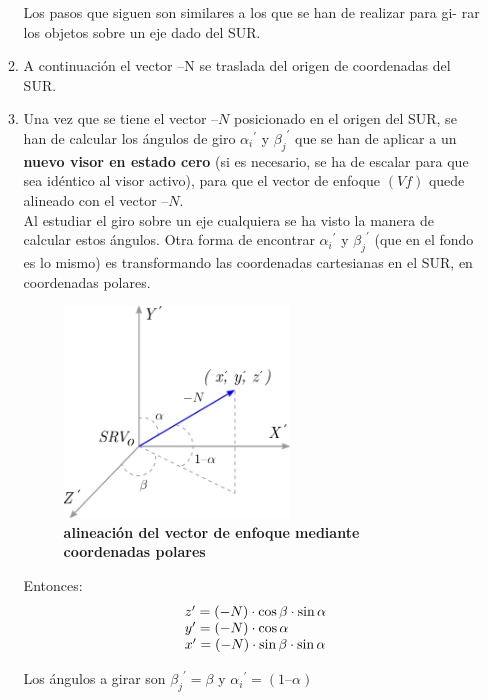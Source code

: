 \begin{itemize}
\begin{enumerate}
        Los pasos que siguen son similares a los que se han de realizar para gi- rar los objetos sobre un eje dado del SUR.
        
        \item A continuación el vector –N se traslada del origen de coordenadas del SUR.
        
        \item Una vez que se tiene el vector $–N$ posicionado en el origen del SUR, se han de calcular los ángulos de giro ${{\alpha}_i}^{\prime}$ y ${{\beta}_j}^{\prime}$ que se han de aplicar a un \textbf{nuevo visor en estado cero} (si es necesario, se ha de escalar para que sea idéntico al visor activo), para que el vector de enfoque $(Vf)$ quede alineado con el vector $–N$.\\
        Al estudiar el giro sobre un eje cualquiera se ha visto la manera de calcular estos ángulos. Otra forma de encontrar ${{\alpha}_i}^{\prime}$ y ${{\beta}_j}^{\prime}$ (que en el fondo es lo mismo) es transformando las coordenadas cartesianas en el SUR, en coordenadas polares. 
        
        \begin{figure}[h]
        \includegraphics[width=6cm]{Img/GEO/geo-visor-11.png}
        \centering
        \caption{\footnotesize{\textbf{alineación del vector de enfoque mediante coordenadas polares}}}
        \label{geo-visor11}
        \end{figure}
        
        Entonces:
        $$
        \begin{array}{l@{}l}
        {z^{\prime}} = (-N) \cdot \cos{\beta} \cdot \sin{\alpha}\\
        {y^{\prime}} = (-N) \cdot \cos{\alpha}\\
        {x^{\prime}} = (-N) \cdot \sin{\beta} \cdot \sin{\alpha}
        \end{array}
        $$
        
        Los ángulos a girar son ${{\beta}_j}^{\prime} = \beta$  y ${{\alpha}_i}^{\prime} = (1 – \alpha) $
        

\end{enumerate}
\end{itemize}

